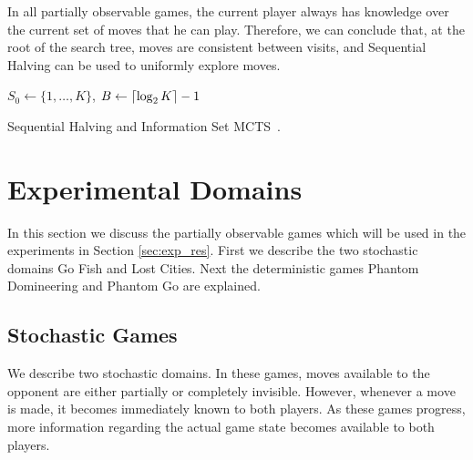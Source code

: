 \documentclass[a4paper]{llncs}
\DeclarePairedDelimiter{\ceil}{\lceil}{\rceil}
\DeclarePairedDelimiter{\floor}{\lfloor}{\rfloor}
\begin{document}
In all partially observable games, the current player always has knowledge over the current set of moves that he can play. Therefore, we can conclude that, at the root of the search tree, moves are consistent between visits, and Sequential Halving can be used to uniformly explore moves.

\IncMargin{1em}
\begin{algorithm2e}[ht]
	\vspace{0.05cm}
	$S_0 \gets \{1,\dots,K\}$,
	$B \gets \ceil{\log_2{K}} - 1$														\;
	\BlankLine
  \caption[Sequential Halving]{Sequential Halving and Information Set MCTS~\protect\cite{Karnin13SH,cowling2012}. \label{alg:seqhalv-mcts}}
\end{algorithm2e}
\DecMargin{1em}

\section{Experimental Domains}
\label{sec:exp_dom}

In this section we discuss the partially observable games which will be used in the experiments in Section \ref{sec:exp_res}. First we describe the two stochastic domains Go Fish and Lost Cities. Next the deterministic games Phantom Domineering and Phantom Go are explained.

\subsection{Stochastic Games}

We describe two stochastic domains. In these games, moves available to the opponent are either partially or completely invisible. However, whenever a move is made, it becomes immediately known to both players. As these games progress, more information regarding the actual game state becomes available to both players.
\end{document}

